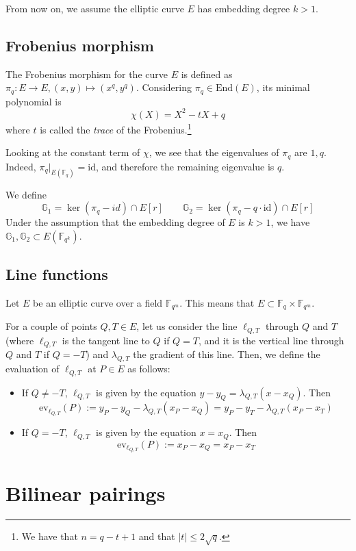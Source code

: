 \documentclass{article}
\newcommand{\gOne}{\mathbb{G}_1}
\newcommand{\gTwo}{\mathbb{G}_2}
\newcommand{\ev}{\mathrm{ev}}
\newcommand{\fq}[1]{\mathbb{F}_{q^{#1}}}
\newcommand{\frob}{\pi_q}
\theoremstyle{remark}
\theoremstyle{plain}
\begin{document}
From now on, we assume the elliptic curve $E$ has embedding degree $k > 1$.

\subsection{Frobenius morphism}

The Frobenius morphism for the curve $E$ is defined as $\frob \colon E \rightarrow E, (x,y) \mapsto (x^q,y^q)$.
Considering $\frob \in \mathrm{End}(E)$, its minimal polynomial is
\[
    \chi(X) = X^2 - tX + q
\]
where $t$ is called the \emph{trace} of the Frobenius.\footnote{We have that $n = q - t + 1$ and that $\vert t \vert \leq 2 \sqrt{q}$.}

Looking at the constant term of $\chi$, we see that the eigenvalues of $\frob$ are $1, q$.
Indeed, $\frob \vert_{E(\fq{})} = \mathrm{id}$, and therefore the remaining eigenvalue is $q$.

We define
\[
\gOne = \ker (\frob - id) \cap E[r] \quad \quad \gTwo = \ker (\frob - q \cdot \mathrm{id}) \cap E[r]
\]
Under the assumption that the embedding degree of $E$ is $k > 1$, we have $\gOne, \gTwo \subset E(\fq{k})$.

\subsection{Line functions}

Let $E$ be an elliptic curve over a field $\fq{m}$.
This means that $E \subset \fq{} \times \fq{m}$.

For a couple of points $Q,T \in E$, let us consider the line $\ell_{Q,T}$ through $Q$ and $T$ (where $\ell_{Q,T}$ is the tangent line to $Q$ if $Q = T$, and it is the vertical line through $Q$ and $T$ if $Q = -T$) and $\lambda_{Q,T}$ the gradient of this line.
Then, we define the evaluation of $\ell_{Q,T}$ at $P \in E$ as follows:
\begin{itemize}
    \item If $Q \neq -T$, $\ell_{Q,T}$ is given by the equation $y - y_Q = \lambda_{Q,T} (x - x_Q)$. Then
    \[
        \ev_{\ell_{Q,T}}(P) := y_P - y_Q - \lambda_{Q,T} (x_P - x_Q) = y_P - y_T - \lambda_{Q,T} (x_P - x_T)
    \]
    \item If $Q = -T$, $\ell_{Q,T}$ is given by the equation $x = x_Q$. Then
    \[
        \ev_{\ell_{Q,T}}(P) := x_P - x_Q = x_P - x_T
    \]
\end{itemize}

\section{Bilinear pairings}
\end{document}
